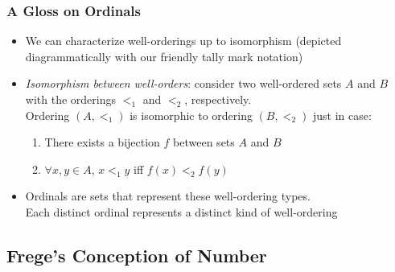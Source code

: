 \begin{frame}
\frametitle{A Gloss on Ordinals}

\begin{itemize}[<+->]

\item We can characterize well-orderings up to isomorphism (depicted diagrammatically with our friendly tally mark notation) 

\item \emph{Isomorphism between well-orders}: consider two well-ordered sets $A$ and $B$ with the orderings $<_1$ and $<_2$, respectively. \\ Ordering $(A, <_1)$ is isomorphic to ordering $(B, <_2)$ just in case:

\begin{enumerate}

\item There exists a bijection $f$ between sets $A$ and $B$

\item $\forall x, y \in A$, $x <_1 y$ iff $f(x) <_2 f(y)$

\end{enumerate}

\bigskip

\item Ordinals are sets that represent these well-ordering types. \\ Each distinct ordinal represents a distinct kind of well-ordering 


\end{itemize}
\end{frame}




\subsection{Frege's Conception of Number}


